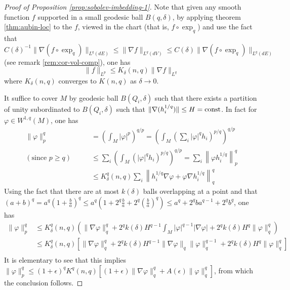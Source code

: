 \documentclass[11pt]{article}
\begin{document}
\begin{proof}[Proof of Proposition \ref{prop:sobolev-imbedding-1}]
Note that given any smooth function \(f\) supported in a small geodesic ball \(B(q,\delta)\),
by applying theorem \ref{thm:aubin-loc} to the \(f\), viewed in the chart (that is,
\(f\circ \exp_q\)) and use the fact that \(C(\delta)^{-1} \|\nabla (f\circ\exp_q)\|_{L^q(dE)} \leq \|\nabla f\|_{L^q(dV)} \leq C(\delta)
\|\nabla (f\circ\exp_q)\|_{L^q(dE)}\) (see remark \ref{rem:cor-vol-comp}), one has
\[
\|f\|_{L^p} \leq K_\delta(n,q) \|\nabla f \|_{L^q}
\]
where \(K_\delta(n,q)\) converges to \(K(n,q)\) as \(\delta\to 0\).


It suffice to cover \(M\) by geodesic ball \(B(Q_i,\delta)\) such that there exists a
partition of unity subordinated to \(B(Q_i,\delta)\) such that
\(\|\nabla (h_i^{1/q})\| \leq H=\mathop{\rm const }\nolimits\). In fact for \(\varphi \in W^{1,q}(M)\), one has
\begin{equation*}
\begin{split}
\|\varphi\|_p^q &= \left(\int_M |\varphi|^p\right)^{q/p}=\left(\int_M \left(\sum_i |\varphi|^q h_i\right)^{p/q} \right)^{q/p}\\
(\text{since } p\geq q)\qquad		&\leq \sum_i\left(\int_M \left(|\varphi|^q h_i\right)^{p/q} \right)^{q/p} = \sum_i \left\| \varphi h_i^{1/q} \right\|_p^q\\
	       	     			&\leq K^q_\delta(n,q) \sum_i \left\| h_i^{1/q}\nabla\varphi + \varphi\nabla h_i^{1/q}\right\|_q^q
\end{split}   
\end{equation*}
Using the fact that there are at most \(k(\delta)\) balls overlapping at a point and that \((a+b)^q = a^q \left(1+ \frac{b}{a}\right)^q \leq a^q(1 + 2^q \frac{b}{a} +
2^q (\frac{b}{a})^{q})\leq a^q + 2^q ba^{q-1} + 2^{q}b^q\), one has
\begin{equation*}
\begin{split}
\|\varphi\|_{p}^q &\leq K^q_\delta(n,q)\left(\|\nabla\varphi\|_q^q + 2^q k(\delta) H^{q-1}\int_M |\varphi|^{q-1}|\nabla\varphi| + 2^q k(\delta) H^q \| \varphi\|_q^q \right) \\
		  &\leq K^q_\delta(n,q)\left[\|\nabla\varphi\|_q^q + 2^q k(\delta) H^{q-1}\|\nabla\varphi\|_q\|\varphi\|_q^{q-1}  + 2^q k(\delta) H^q \| \varphi\|_q^q \right]\\
\end{split}   
\end{equation*}
It is elementary to see that this implies
\(\|\varphi\|_{p}^q \leq (1+\epsilon)^qK^q(n,q)\left[(1+\epsilon)\|\nabla\varphi\|_q^q +
A(\epsilon) \| \varphi\|_q^q \right]\), from which the conclusion follows.  


\end{proof}
\end{document}

